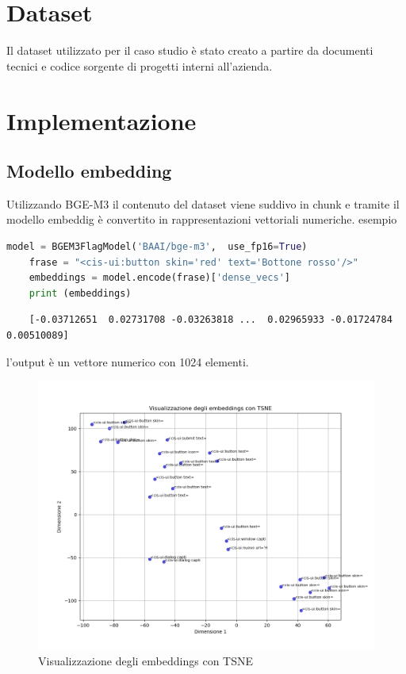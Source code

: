 \documentclass[12pt,a4paper,openright,twoside]{book}
\begin{document}
\section{Dataset}
Il dataset utilizzato per il caso studio è stato creato a partire da documenti tecnici e codice sorgente di progetti interni all'azienda.

\section{Implementazione}
\subsection{Modello embedding}
Utilizzando BGE-M3 il contenuto del dataset viene suddivo in chunk e tramite il modello embeddig è convertito in rappresentazioni vettoriali numeriche.
esempio
\begin{lstlisting}[language=Python]
    model = BGEM3FlagModel('BAAI/bge-m3',  use_fp16=True)
    frase = "<cis-ui:button skin='red' text='Bottone rosso'/>"
    embeddings = model.encode(frase)['dense_vecs']
    print (embeddings)
\end{lstlisting}
\begin{verbatim}
    [-0.03712651  0.02731708 -0.03263818 ...  0.02965933 -0.01724784  0.00510089]
\end{verbatim}
l'output è un vettore numerico con 1024 elementi.

\begin{figure}[h]
    \centering
    \includegraphics[width=\textwidth]{figures/vis_embeddings_TSE.png}
    \caption{Visualizzazione degli embeddings con TSNE}
    \label{fig:vis_embeddings_tsne}
\end{figure}
\end{document}
